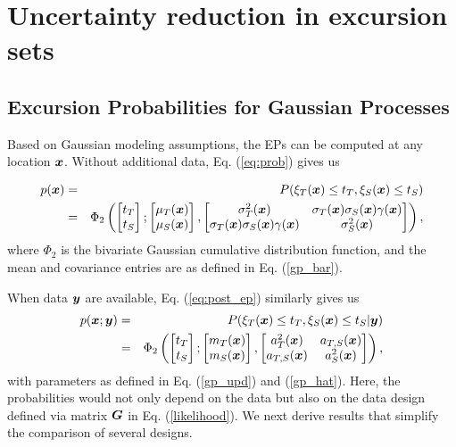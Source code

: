 \documentclass[aoas]{imsart}
\begin{document}
\section{Uncertainty reduction in excursion sets}
\label{sec:sur}

\subsection{Excursion Probabilities for Gaussian Processes}

Based on Gaussian modeling assumptions, the EPs can be computed at any
location ${\boldsymbol x}$. Without additional data, Eq.  (\ref{eq:prob}) gives us

\begin{eqnarray}\label{eq:prob_mv0}
 p(\bx) &=& P(\xi_T(\bx) \leq t_T, \xi_S(\bx) \leq t_S) \nonumber \\
 &=& \Phi_2 \begin{pmatrix} 
\begin{bmatrix} t_T\\
t_S
\end{bmatrix};
\begin{bmatrix} \mu_{T}(\bx)\\
\mu_{S}(\bx)
\end{bmatrix},\begin{bmatrix}
\sigma_{T}^2(\bx) & \sigma_{T}(\bx)\sigma_{S}(\bx) \gamma(\bx)  \\
\sigma_{T}(\bx)\sigma_{S}(\bx) \gamma(\bx)  & \sigma_{S}^2(\bx)  
\end{bmatrix}\end{pmatrix},
\end{eqnarray}
where $\Phi_2$ is the bivariate Gaussian cumulative distribution
function, and the mean and covariance entries are as defined in Eq. (\ref{gp_bar}).

When data ${\boldsymbol y}$ are available, Eq. (\ref{eq:post_ep}) similarly gives
us
\begin{eqnarray}\label{eq:prob_mv}
 p(\bx;\by) &=& P(\xi_T(\bx) \leq t_T, \xi_S(\bx) \leq t_S |\by)
 \nonumber \\
 &=& \Phi_2 \begin{pmatrix} 
\begin{bmatrix} t_T\\
t_S
\end{bmatrix};
\begin{bmatrix} m_{T}(\bx)\\
m_{S}(\bx)
\end{bmatrix},\begin{bmatrix}
a_{T}^2(\bx) & a_{T,S}(\bx)  \\
a_{T,S}(\bx)  & a_{S}^2(\bx)  
\end{bmatrix}\end{pmatrix},
\end{eqnarray}
with parameters as defined in Eq. (\ref{gp_upd}) and (\ref{gp_hat}). Here, the probabilities would not only depend on the data but also on the data design defined via matrix ${\boldsymbol G}$ in Eq. (\ref{likelihood}). We next derive results that simplify the comparison of several designs.
\end{document}
